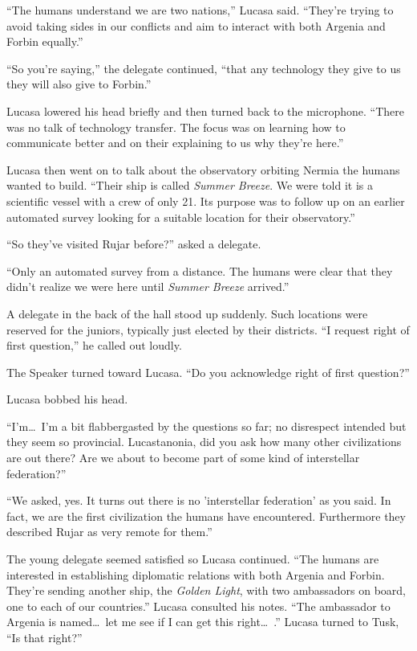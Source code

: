 ``The humans understand we are two nations,'' Lucasa said. ``They're trying to avoid taking
sides in our conflicts and aim to interact with both Argenia and Forbin equally.''

``So you're saying,'' the delegate continued, ``that any technology they give to us they will
also give to Forbin.''

Lucasa lowered his head briefly and then turned back to the microphone. ``There was no talk of
technology transfer. The focus was on learning how to communicate better and on their explaining
to us why they're here.''

Lucasa then went on to talk about the observatory orbiting Nermia the humans wanted to build.
``Their ship is called \textit{Summer Breeze}. We were told it is a scientific vessel with a
crew of only 21. Its purpose was to follow up on an earlier automated survey looking for a
suitable location for their observatory.''

``So they've visited Rujar before?'' asked a delegate.

``Only an automated survey from a distance. The humans were clear that they didn't realize we
were here until \textit{Summer Breeze} arrived.''

A delegate in the back of the hall stood up suddenly. Such locations were reserved for the
juniors, typically just elected by their districts. ``I request right of first question,'' he
called out loudly.

The Speaker turned toward Lucasa. ``Do you acknowledge right of first question?''

Lucasa bobbed his head.

``I'm\ldots\ I'm a bit flabbergasted by the questions so far; no disrespect intended but they
seem so provincial. Lucastanonia, did you ask how many other civilizations are out there? Are we
about to become part of some kind of interstellar federation?''

``We asked, yes. It turns out there is no 'interstellar federation' as you said. In fact, we are
the first civilization the humans have encountered. Furthermore they described Rujar as very
remote for them.''

The young delegate seemed satisfied so Lucasa continued. ``The humans are interested in
establishing diplomatic relations with both Argenia and Forbin. They're sending another ship,
the \textit{Golden Light}, with two ambassadors on board, one to each of our countries.'' Lucasa
consulted his notes. ``The ambassador to Argenia is named\ldots\ let me see if I can get this
right\ldots\ .'' Lucasa turned to Tusk, ``Is that right?''

